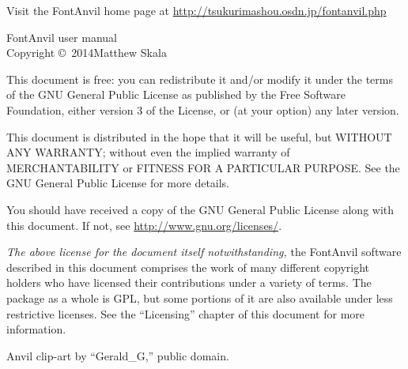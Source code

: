 \documentclass[11pt]{report}
\begin{document}
\begin{minipage}{\linewidth}
\noindent
Visit the FontAnvil home page at
\url{http://tsukurimashou.osdn.jp/fontanvil.php}

\vspace*{1in}

FontAnvil user manual\\
Copyright \copyright\ 2014\quad Matthew Skala

\vspace{\baselineskip}

This document is free: you can redistribute it and/or modify
it under the terms of the GNU General Public License as published by
the Free Software Foundation, either version 3 of the License, or
(at your option) any later version.

\vspace{\baselineskip}

This document is distributed in the hope that it will be useful,
but WITHOUT ANY WARRANTY; without even the implied warranty of
MERCHANTABILITY or FITNESS FOR A PARTICULAR PURPOSE.  See the
GNU General Public License for more details.

\vspace{\baselineskip}

You should have received a copy of the GNU General Public License
along with this document.  If not, see \url{http://www.gnu.org/licenses/}.

\vspace*{0.75in}

\emph{The above license for the document itself notwithstanding,} the
FontAnvil software described in this document comprises the work of many
different copyright holders who have licensed their contributions under a
variety of terms.  The package as a whole is GPL, but some portions of it
are also available under less restrictive licenses.  See the ``Licensing''
chapter of this document for more information.

\vspace{\baselineskip}

Anvil clip-art by ``Gerald\_{}G,'' public domain.

\end{minipage}

\clearpage


\renewcommand\contentsname{Contents}
\renewcommand{\cftbeforesubsecskip}{0pt}
\end{document}
